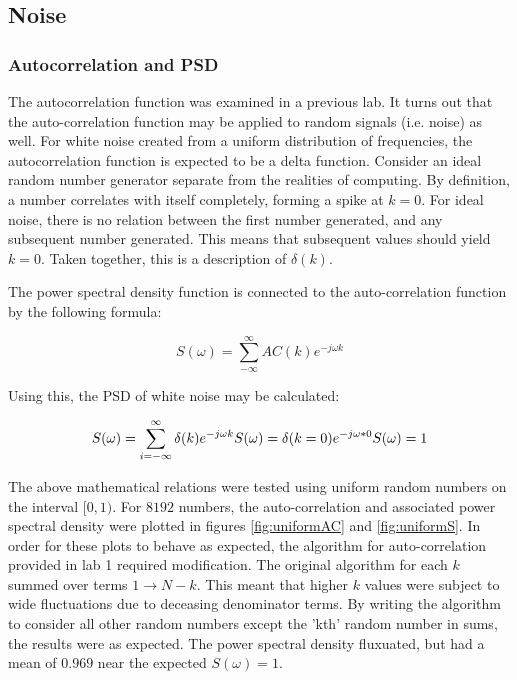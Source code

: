 \documentclass[twocolumn]{article}
\begin{document}
\subsection{Noise}
\subsubsection{Autocorrelation and PSD}
The autocorrelation function was examined in a previous lab. It turns out that the auto-correlation function may be applied to random signals (i.e. noise) as well. For white noise created from a uniform distribution of frequencies, the autocorrelation function is expected to be a delta function. Consider an ideal random number generator separate from the realities of computing. By definition, a number correlates with itself completely, forming a spike at $k=0$. For ideal noise, there is no relation between the first number generated, and any subsequent number generated. This means that subsequent values should yield $k=0$. Taken together, this is a description of $\delta(k)$.

The power spectral density function is connected to the auto-correlation function by the following formula:

\[ S(\omega) = \sum_{-\infty}^{\infty} AC(k)e^{-j\omega k} \]

Using this, the PSD of white noise may be calculated:

\[ S(\omega) =  \sum_{i=-\infty}^{\infty} \delta (k) e^{-j\omega k}\\
S(\omega) = \delta(k=0) e^{-j\omega * 0} \\
S(\omega) = 1
\] 

The above mathematical relations were tested using uniform random numbers on the interval $[0,1)$. For $8192$ numbers, the auto-correlation and associated power spectral density were plotted in figures \ref{fig:uniformAC} and \ref{fig:uniformS}. In order for these plots to behave as expected, the algorithm for auto-correlation provided in lab 1 required modification. The original algorithm for each $k$ summed over terms $1\to N-k$. This meant that higher $k$ values were subject to wide fluctuations due to deceasing denominator terms. By writing the algorithm to consider all other random numbers except the 'kth' random number in sums, the results were as expected. The power spectral density fluxuated, but had a mean of $0.969$ near the expected $S(\omega)=1$.
\end{document}

